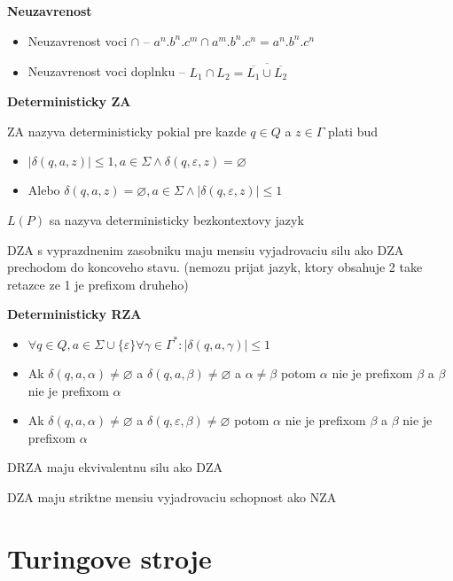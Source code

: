 \documentclass[12pt]{article}
\begin{document}
\textbf{Neuzavrenost}
\begin{itemize}
	\item Neuzavrenost voci $\cap$ -- $a^{n}.b^{n}.c^{m} \cap a^{m}.b^{n}.c^{n} = a^{n}.b^{n}.c^{n}$
	\item Neuzavrenost voci doplnku -- $L_{1} \cap L_{2} = \overline{\overline{L_{1}} \cup \overline{L_{2}}}$
\end{itemize}

\textbf{Deterministicky ZA}

ZA nazyva deterministicky pokial pre kazde $q \in Q$ a $z \in \Gamma$ plati bud
\begin{itemize}
	\item $|\delta(q,a,z)| \le 1, a \in \Sigma \land \delta(q,\varepsilon,z) = \varnothing$
	\item Alebo $\delta(q,a,z) = \varnothing, a \in \Sigma \land |\delta(q,\varepsilon,z)| \le 1$
\end{itemize}
$L(P)$ sa nazyva deterministicky bezkontextovy jazyk

DZA s vyprazdnenim zasobniku maju mensiu vyjadrovaciu silu ako DZA prechodom do koncoveho stavu. (nemozu prijat
jazyk, ktory obsahuje 2 take retazce ze 1 je prefixom druheho)

\textbf{Deterministicky RZA}
\begin{itemize}
	\item $\forall q \in Q, a \in \Sigma \cup \{\varepsilon\} \forall \gamma \in \Gamma^{*}: |\delta(q,a,\gamma)| \le 1$
	\item Ak $\delta(q,a,\alpha) \not= \varnothing$ a $\delta(q,a,\beta) \not= \varnothing$ a $\alpha \not= \beta$ potom $\alpha$ nie je prefixom $\beta$
		a $\beta$ nie je prefixom $\alpha$
	\item Ak $\delta(q,a,\alpha) \not= \varnothing$ a $\delta(q,\varepsilon,\beta) \not= \varnothing$ potom $\alpha$ nie je prefixom $\beta$
		a $\beta$ nie je prefixom $\alpha$
\end{itemize}

DRZA maju ekvivalentnu silu ako DZA

DZA maju striktne mensiu vyjadrovaciu schopnost ako NZA

\section{Turingove stroje}
\end{document}
